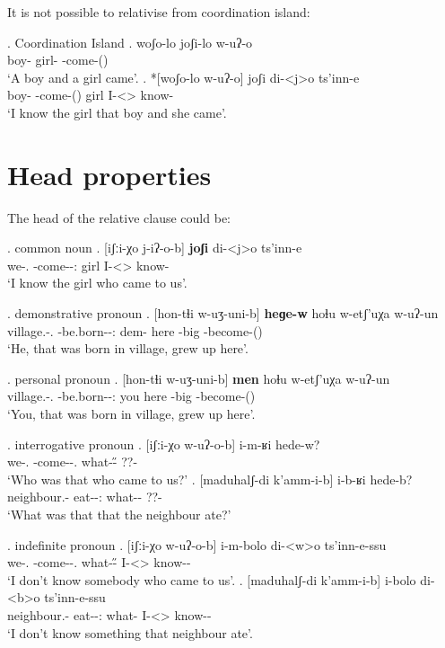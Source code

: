 It is not possible to relativise from coordination island:

\ex. Coordination Island
	\ag. woʃo-lo joʃi-lo w-uʔ-o\\
			{boy-\Addi} {girl-\Addi} {\M-come-\Pst(\Aor)}\\
			\glt `A boy and a girl came'.	
	\bg. *[woʃo-lo w-uʔ-o] joʃi di-<j>o ts'inn-e\\
			{boy-\Addi} {\M-come-\Pst(\Aor)} girl {I-<\F>\Aff} {know-\Hab}\\
			\glt `I know the girl that boy and she came'.

\section{Head properties}
The head of the relative clause could be:

\ex. common noun
	\ag. [iʃːi-χo j-iʔ-o-b] \textbf{joʃi} di-<j>o ts'inn-e \\
		  {we-\Add.\Lat} {\F-come-\Pst-\Ptcp:\Pst} {girl} {I-<\F>\Aff} {know-\Hab}\\
		 \glt    `I know the girl who came to us'.

\ex. demonstrative pronoun
	\ag. [hon-tɬi w-uʒ-uni-b] \textbf{heɡe-w} hoɬu w-etʃ'uχa w-uʔ-un\\
			{village.\Obl-\Inter.\Ess} {\M-be.born-\Pst-\Ptcp:\Pst} {dem-\M} here {\M-big} {\M-become-\Pst(\Aor)}\\
			\glt `He, that was born in village, grew up here'.

\ex. personal pronoun
	\ag. [hon-tɬi w-uʒ-uni-b] \textbf{men} hoɬu w-etʃ'uχa w-uʔ-un\\
			{village.\Obl-\Inter.\Ess} {\M-be.born-\Pst-\Ptcp:\Pst} you here {\M-big} {\M-become-\Pst(\Aor)}\\
			\glt `You, that was born in village, grew up here'.
			
\ex. interrogative pronoun
	\ag. [iʃːi-χo w-uʔ-o-b] i-m-ʁi hede-w?\\
			{we-\Add.\Lat} {\M-come-\Pst-\Ptcp.\Pst} {what-\H-\Wh} {??-\M}\\
			\glt `Who was that who came to us?'
	\bg. [maduhalʃ-di k'amm-i-b] i-b-ʁi hede-b?\\
			{neighbour.\Obl-\Erg} {eat-\Pst-\Ptcp:\Pst} {what-\Nh-\Wh} {??-\Nanf}\\
			\glt `What was that that the neighbour ate?'
		
\ex. indefinite pronoun
	\ag.  [iʃːi-χo w-uʔ-o-b] i-m-bolo di-<w>o  ts'inn-e-ssu\\
			{we-\Add.\Lat} {\M-come-\Pst-\Ptcp.\Pst} {what-\H-\Indef} {I-<\M>\Aff} {know-\Hab-\Neg}\\
			\glt `I don't know somebody who came to us'.
	\bg.  [maduhalʃ-di k'amm-i-b] i-bolo di-<b>o  ts'inn-e-ssu\\
			{neighbour.\Obl-\Erg} {eat-\Pst-\Ptcp:\Pst} {what-\Indef} {I-<\M>\Aff} {know-\Hab-\Neg}\\
			\glt `I don't know something that neighbour ate'.

